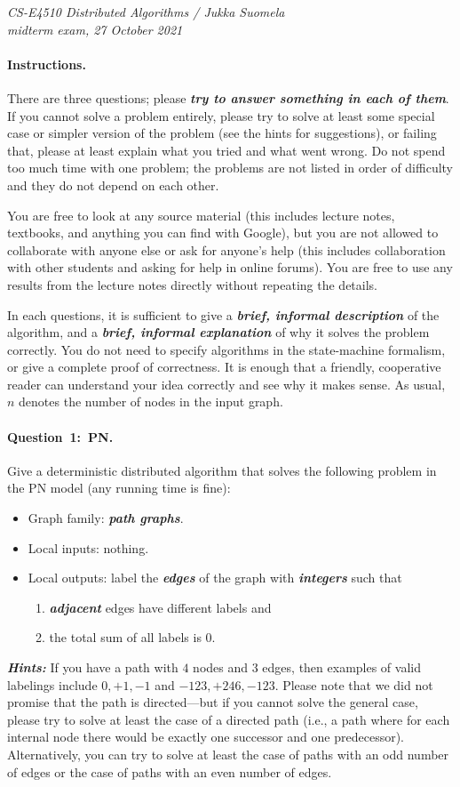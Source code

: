 \documentclass[12pt,a4paper]{article}
\newcommand{\q}[2]{\paragraph{\mbox{Question #1: }#2.}}
\newcommand{\hl}[1]{\textbf{\emph{#1}}}
\newcommand{\cemph}[1]{\textcolor{hlcolor}{\textbf{\emph{\boldmath #1}}}}
\begin{document}
\noindent
\emph{CS-E4510 Distributed Algorithms / Jukka Suomela\\
midterm exam, 27 October 2021}

\paragraph{Instructions.}

There are three questions; please \cemph{try to answer something in each of them}. If you cannot solve a problem entirely, please try to solve at least some special case or simpler version of the problem (see the hints for suggestions), or failing that, please at least explain what you tried and what went wrong. Do not spend too much time with one problem; the problems are not listed in order of difficulty and they do not depend on each other.

You are free to look at any source material (this includes lecture notes, textbooks, and anything you can find with Google), but you are not allowed to collaborate with anyone else or ask for anyone's help (this includes collaboration with other students and asking for help in online forums). You are free to use any results from the lecture notes directly without repeating the details.

In each questions, it is sufficient to give a \cemph{brief, informal description} of the algorithm, and a \cemph{brief, informal explanation} of why it solves the problem correctly. You do not need to specify algorithms in the state-machine formalism, or give a complete proof of correctness. It is enough that a friendly, cooperative reader can understand your idea correctly and see why it makes sense. As usual, $n$ denotes the number of nodes in the input graph.

\q{1}{PN}

Give a deterministic distributed algorithm that solves the following problem in the PN model (any running time is fine):
\begin{itemize}
    \item Graph family: \cemph{path graphs}.
    \item Local inputs: nothing.
    \item Local outputs: label the \cemph{edges} of the graph with \cemph{integers} such that
    \begin{enumerate}[noitemsep]
        \item \cemph{adjacent} edges have different labels and
        \item the total sum of all labels is $0$.
    \end{enumerate}
\end{itemize}
\hl{Hints:} If you have a path with $4$ nodes and $3$ edges, then examples of valid labelings include $0,+1,-1$ and $-123,+246,-123$. Please note that we did not promise that the path is directed---but if you cannot solve the general case, please try to solve at least the case of a directed path (i.e., a path where for each internal node there would be exactly one successor and one predecessor). Alternatively, you can try to solve at least the case of paths with an odd number of edges or the case of paths with an even number of edges.
\end{document}

